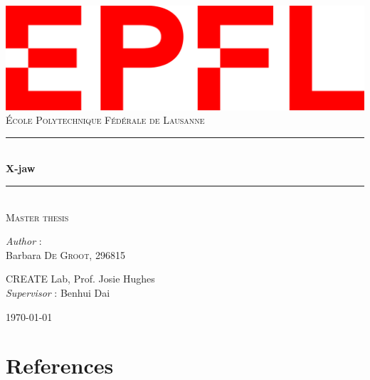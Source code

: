 \documentclass[11pt,a4paper]{article}
\begin{document}
    \begin{titlepage}
    \newcommand{\HRule}{\rule{\linewidth}{0.5mm}}
    \center
    \includegraphics[scale=0.25]{Figures/logo.png}\\[0.4cm]

    \textsc{\LARGE École Polytechnique Fédérale de Lausanne}\\[1.5cm]
    \vfill
    
    \HRule \\[0.4cm]
    {\huge \bfseries X-jaw}\\
    \HRule
    \\[0.5cm]
    
    \textsc{\Large Master thesis}
    \vfill 
   
    \centering
    \bigskip
    \textit{Author} : \\[0.2cm]

    Barbara \textsc{De Groot, 296815}\\

    \bigskip
    \bigskip

    CREATE Lab, Prof. Josie Hughes\\
    \textit{Supervisor} : Benhui Dai\\[0.2cm]

    \bigskip
    \bigskip
    
    {\large \today}\\[2cm]
    \end{titlepage}

\newpage
\tableofcontents

\newpage
%






\newpage
\section{References}
\printbibliography[heading=none]

% 
% 
\end{document}

